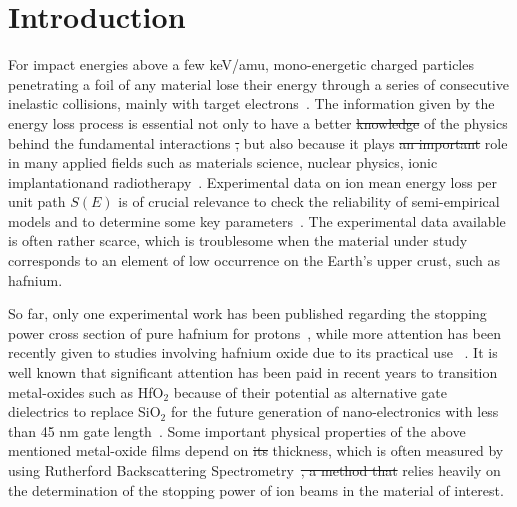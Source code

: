 \documentclass[aps,pra,reprint,superscriptaddress]{revtex4-1}
\providecommand{\DIFadd}[1]{{\protect\color{blue}\uwave{#1}}} %
\providecommand{\DIFdel}[1]{{\protect\color{red}\sout{#1}}}                      %
\providecommand{\DIFaddbegin}{} %
\providecommand{\DIFaddend}{} %
\providecommand{\DIFdelbegin}{} %
\providecommand{\DIFdelend}{} %
\newcommand{\DIFscaledelfig}{0.5}
\newlength{\DIFdelgraphicswidth} %
\newlength{\DIFdelgraphicsheight} %
\newcommand{\DIFaddincludegraphics}[2][]{{\color{blue}\fbox{\DIFOincludegraphics[#1]{#2}}}} %
\newcommand{\DIFdelincludegraphics}[2][]{%
\sbox{\DIFdelgraphicsbox}{\DIFOincludegraphics[#1]{#2}}%
\settoboxwidth{\DIFdelgraphicswidth}{\DIFdelgraphicsbox} %
\settoboxtotalheight{\DIFdelgraphicsheight}{\DIFdelgraphicsbox} %
\scalebox{\DIFscaledelfig}{%
\parbox[b]{\DIFdelgraphicswidth}{\usebox{\DIFdelgraphicsbox}\\[-\baselineskip] \rule{\DIFdelgraphicswidth}{0em}}\llap{\resizebox{\DIFdelgraphicswidth}{\DIFdelgraphicsheight}{%
\setlength{\unitlength}{\DIFdelgraphicswidth}%
\begin{picture}(1,1)%
\thicklines\linethickness{2pt} %
{\color[rgb]{1,0,0}\put(0,0){\framebox(1,1){}}}%
{\color[rgb]{1,0,0}\put(0,0){\line( 1,1){1}}}%
{\color[rgb]{1,0,0}\put(0,1){\line(1,-1){1}}}%
\end{picture}%
}\hspace*{3pt}}} %
} %
\DeclareRobustCommand{\DIFaddbegin}{\DIFOaddbegin \let\includegraphics\DIFaddincludegraphics} %
\DeclareRobustCommand{\DIFaddend}{\DIFOaddend \let\includegraphics\DIFOincludegraphics} %
\DeclareRobustCommand{\DIFdelbegin}{\DIFOdelbegin \let\includegraphics\DIFdelincludegraphics} %
\DeclareRobustCommand{\DIFdelend}{\DIFOaddend \let\includegraphics\DIFOincludegraphics} %
\begin{document}
 

\maketitle

\DIFdelbegin %
\DIFdelend %
\section{Introduction}
\label{intro}

For impact energies above a few keV/amu, mono-energetic charged 
particles penetrating a foil of any material lose their energy through 
a series of consecutive inelastic collisions, mainly with target 
electrons~\cite{Chu01,Sigmund}. The information given by the energy 
loss process is essential not only to have a better \DIFdelbegin \DIFdel{knowledge }\DIFdelend \DIFaddbegin \DIFadd{comprehension }\DIFaddend of the 
physics behind the fundamental interactions \DIFdelbegin \DIFdel{, }\DIFdelend but also because it plays 
\DIFdelbegin \DIFdel{an important }\DIFdelend \DIFaddbegin \DIFadd{a vital }\DIFaddend role in many applied fields such as materials science, 
nuclear physics, ionic implantation\DIFaddbegin \DIFadd{, }\DIFaddend and radiotherapy~\cite{Sigmund,Schardt}. 
Experimental data on ion mean energy loss per unit path $S(E)$ is of 
crucial relevance to check the reliability of semi-empirical models and 
to determine some key parameters~\cite{Diwan,Damache04,Damache02}. The 
experimental data available is often rather scarce, which is troublesome 
when the material under study corresponds to an element of low 
occurrence on the Earth's upper crust, such as hafnium.

So far, only one experimental work has been published regarding the 
stopping power cross section of pure hafnium for protons~\cite{Sirotinin}, 
while more attention has been recently given to studies involving 
hafnium oxide due to its practical use~\cite{Abril,Behar,Primetzhofer,Roth}\DIFdelbegin %
\DIFdelend . 
It is well known that significant attention has been paid in recent 
years to transition metal-oxides such as HfO$_2$ because of their 
potential as alternative gate dielectrics to replace SiO$_2$ for the 
future generation of nano-electronics with less than 45 nm gate 
length~\cite{Choi,Robertson}. Some important physical properties of the 
above mentioned metal-oxide films depend on \DIFdelbegin \DIFdel{its }\DIFdelend \DIFaddbegin \DIFadd{their }\DIFaddend thickness, which is 
often measured by using Rutherford Backscattering 
Spectrometry~\cite{Alfassi01,Tesmer01}\DIFdelbegin \DIFdel{, 
a method that }\DIFdelend \DIFaddbegin \DIFadd{. This method }\DIFaddend relies heavily on 
the determination of the stopping power of ion beams in the material of 
interest.
\end{document}

